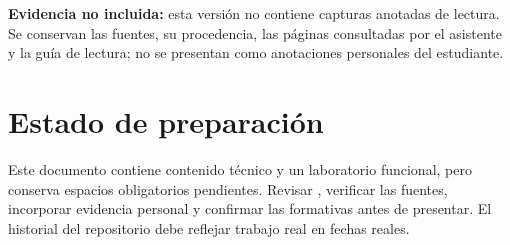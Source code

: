 \documentclass[11pt,a4paper]{article}
\begin{document}
\textbf{Evidencia no incluida:} esta versión no contiene capturas anotadas de lectura. Se conservan las fuentes, su procedencia, las páginas consultadas por el asistente y la guía de lectura; no se presentan como anotaciones personales del estudiante.
\section{Estado de preparación}
Este documento contiene contenido técnico y un laboratorio funcional, pero conserva espacios obligatorios pendientes. Revisar , verificar las fuentes, incorporar evidencia personal y confirmar las formativas antes de presentar. El historial del repositorio debe reflejar trabajo real en fechas reales.
\end{document}

